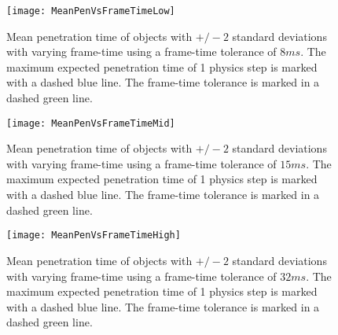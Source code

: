 \begin{figure}
	\centering
	\texttt{[image: MeanPenVsFrameTimeLow]}
	\caption{Mean penetration time of objects with $+/-2$ standard deviations with varying frame-time using a frame-time tolerance of $8ms$. The maximum expected penetration time of 1 physics step is marked with a dashed blue line. The frame-time tolerance is marked in a dashed green line.}
	\label{fig_CollisionsPenVsFrameTimeLow}
\end{figure}
\begin{figure}
	\centering
	\texttt{[image: MeanPenVsFrameTimeMid]}
	\caption{Mean penetration time of objects with $+/-2$ standard deviations with varying frame-time using a frame-time tolerance of $15ms$. The maximum expected penetration time of 1 physics step is marked with a dashed blue line. The frame-time tolerance is marked in a dashed green line.}
	\label{fig_CollisionsPenVsFrameTimeMid}
\end{figure}
\begin{figure}
	\centering
	\texttt{[image: MeanPenVsFrameTimeHigh]}
	\caption{Mean penetration time of objects with $+/-2$ standard deviations with varying frame-time using a frame-time tolerance of $32ms$. The maximum expected penetration time of 1 physics step is marked with a dashed blue line. The frame-time tolerance is marked in a dashed green line.}
	\label{fig_CollisionsPenVsFrameTimeHigh}
\end{figure}

%
%

